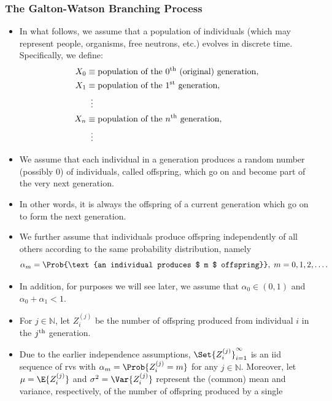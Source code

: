 \subsubsection{The Galton-Watson Branching Process}
\begin{itemize}
    \item In what follows, we assume that a population of individuals (which may represent people,
          organisms, free neutrons, etc.) evolves in discrete time. Specifically, we define:
          \begin{align*}
              X_0 & \equiv \text{population of the $0\textsuperscript{th}$ (original) generation}, \\
              X_1 & \equiv \text{population of the $1\textsuperscript{st}$ generation},            \\
                  & \vdotswithin{\equiv}                                                           \\
              X_n & \equiv \text{population of the $n\textsuperscript{th}$ generation},            \\
                  & \vdotswithin{\equiv}
          \end{align*}
    \item We assume that each individual in a generation produces a random number (possibly $0$) of
          individuals, called offspring, which go on and become part of the very next generation.
    \item In other words, it is always the offspring of a current generation which go on to form the next
          generation.
    \item We further assume that individuals produce offspring independently of all others according to
          the same probability distribution, namely
          \[ \alpha_m=\Prob{\text{an individual produces $ m $ offspring}},\; m=0,1,2,\ldots. \]
    \item In addition, for purposes we will see later, we assume that $ \alpha_0\in(0,1) $ and $ \alpha_0+\alpha_1<1 $.
    \item For $ j\in\mathbb{N} $, let $ Z_i^{(j)} $ be the number of offspring produced from individual $ i $ in the
          $ j\textsuperscript{th} $ generation.
    \item Due to the earlier independence assumptions, $ \Set{Z_i^{(j)}}_{i=1}^\infty $ is an iid sequence of rvs with
          $ \alpha_m=\Prob{Z_i^{(j)}=m} $ for any $ j\in\mathbb{N} $. Moreover, let $ \mu=\E{Z_i^{(j)}} $ and
          $ \sigma^2=\Var{Z_i^{(j)}} $ represent the (common) mean and variance, respectively, of the number of offspring produced by a single

\end{itemize}
